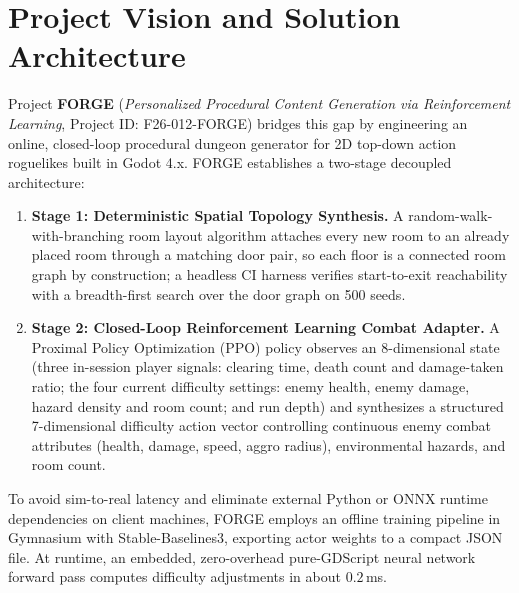 \section*{Project Vision and Solution Architecture}
Project \textbf{FORGE} (\textit{Personalized Procedural Content Generation via Reinforcement Learning}, Project ID: F26-012-FORGE) bridges this gap by engineering an online, closed-loop procedural dungeon generator for 2D top-down action roguelikes built in Godot 4.x. FORGE establishes a two-stage decoupled architecture:
\begin{enumerate}
    \item \textbf{Stage 1: Deterministic Spatial Topology Synthesis.} A random-walk-with-branching room layout algorithm attaches every new room to an already placed room through a matching door pair, so each floor is a connected room graph by construction; a headless CI harness verifies start-to-exit reachability with a breadth-first search over the door graph on 500 seeds.
    \item \textbf{Stage 2: Closed-Loop Reinforcement Learning Combat Adapter.} A Proximal Policy Optimization (PPO) policy observes an 8-dimensional state (three in-session player signals: clearing time, death count and damage-taken ratio; the four current difficulty settings: enemy health, enemy damage, hazard density and room count; and run depth) and synthesizes a structured 7-dimensional difficulty action vector controlling continuous enemy combat attributes (health, damage, speed, aggro radius), environmental hazards, and room count.
\end{enumerate}
To avoid sim-to-real latency and eliminate external Python or ONNX runtime dependencies on client machines, FORGE employs an offline training pipeline in Gymnasium with Stable-Baselines3, exporting actor weights to a compact JSON file. At runtime, an embedded, zero-overhead pure-GDScript neural network forward pass computes difficulty adjustments in about $0.2$\,ms.

